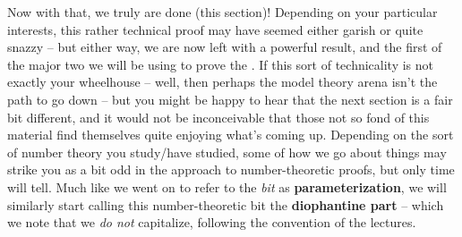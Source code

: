   Now with that, we truly are done (this section)! Depending on your particular interests, this rather technical proof may have seemed either garish or quite snazzy -- but either way, we are now left with a powerful result, and the first of the major two we will be using to prove the \pwt. If this sort of technicality is not exactly your wheelhouse -- well, then perhaps the model theory arena isn't the path to go down -- but you might be happy to hear that the next section is a fair bit different, and it would not be inconceivable that those not so fond of this material find themselves quite enjoying what's coming up. Depending on the sort of number theory you study/have studied, some of how we go about things may strike you as a bit odd in the approach to number-theoretic proofs, but only time will tell. Much like we went on to refer to the \emph{\om bit} as \textbf{parameterization}, we will similarly start calling this number-theoretic bit the \textbf{diophantine part} -- which we note that we \emph{do not} capitalize, following the convention of the lectures.
